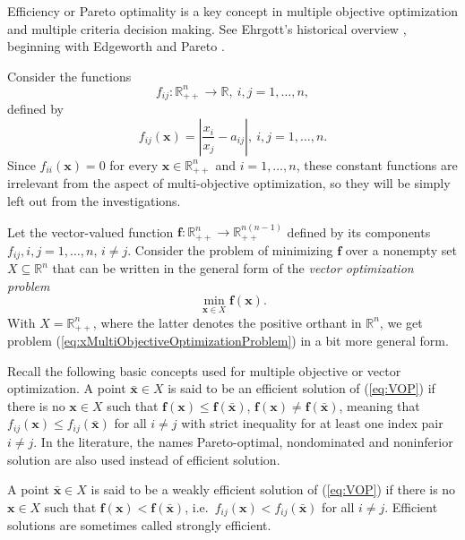 \documentclass{article}
\theoremstyle{plain}
\begin{document}
Ef{\kern0pt}f{\kern0pt}iciency or Pareto optimality \cite[Chapter 2]{Miettinen1998} is
a key concept in multiple objective optimization and multiple criteria decision making.
See Ehrgott's historical overview \cite{Ehrgott2012}, beginning with Edgeworth \cite{Edgeworth1881} and
Pareto \cite{Pareto1906}.

Consider the functions
\begin{equation}
f_{ij}: \mathbb{R}^n_{++}\to \mathbb{R},\  i,j=1,\dots , n,
\nonumber
\end{equation}
def{\kern0pt}ined by
\begin{equation}
f_{ij}(\mathbf{x})= \left| \frac{x_i}{x_j} - a_{ij}  \right|,\
i,j=1,\dots , n. \label{eq:fijx}
\end{equation}
Since $f_{ii}(\mathbf{x})=0$ for every $\mathbf{x} \in
\mathbb{R}^n_{++}$ and $i=1,\dots , n$, these constant functions
are irrelevant from the aspect of multi-objective optimization, so
they will be simply left out from the investigations.

Let the vector-valued function $\mathbf{f}: \mathbb{R}^n_{++}\to
\mathbb{R}^{n(n-1)}_{++}$ def{\kern0pt}ined by its components $f_{ij},
i,j=1,\dots , n,\, i\ne j$. Consider the problem of minimizing
$\mathbf{f}$ over a nonempty set $X\subseteq \mathbb{R}^n$ that
can be written in the general form of the
 \textit{vector optimization problem}
\begin{equation}
\min\limits_{\mathbf{x} \in X} \mathbf{f}(\mathbf{x}).
\label{eq:VOP}
\end{equation}
With $X=\mathbb{R}^n_{++}$, where the latter denotes the positive
orthant in $\mathbb{R}^n$, we get problem
(\ref{eq:xMultiObjectiveOptimizationProblem}) in a bit more
general form.

Recall the following basic concepts used for multiple objective or
vector optimization. A point $\mathbf{\bar x}\in X$ is said to be
an ef{\kern0pt}f{\kern0pt}icient solution of (\ref{eq:VOP}) if there is no
$\mathbf{x}\in X$ such that $\mathbf{f} (\mathbf{x})\le \mathbf{f}
(\mathbf{\bar x})$, $\mathbf{f}(\mathbf{x})\ne
\mathbf{f}(\mathbf{\bar x})$, meaning that $f_{ij}(\mathbf{x})\le
f_{ij}(\mathbf{\bar x})$ for all $i\ne j$ with strict inequality
for at least one index pair $i\ne j$. In the literature, the names
Pareto-optimal, nondominated and noninferior solution are also
used instead of ef{\kern0pt}f{\kern0pt}icient solution.

A point $\mathbf{\bar x}\in X$ is said to be a weakly ef{\kern0pt}f{\kern0pt}icient
solution of (\ref{eq:VOP}) if there is no $\mathbf{x}\in X$ such
that $\mathbf{f} (\mathbf{x})< \mathbf{f} (\mathbf{\bar x})$,
i.e.\ $f_{ij}(\mathbf{x})< f_{ij}(\mathbf{\bar x})$ for all $i\ne
j$. Ef{\kern0pt}f{\kern0pt}icient solutions are sometimes called strongly ef{\kern0pt}f{\kern0pt}icient.
\end{document}
